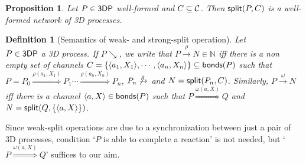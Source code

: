 \documentclass[11pt]{article}
\newcommand{\bonds}{{\sf bonds}}
\newcommand{\Split}{{\sf split}}
\newcommand{\proc}{\sf{3DP}}
\newcommand{\channels}{{\cal C}}
\newcommand{\nar}[1]{\xrightarrow{#1}}
\newcommand{\dnar}[1]{\stackrel{#1}{\Rightarrow}}
\newcommand{\nets}{{\mathbb N}}
\newtheorem{definition}{Definition}
\newtheorem{proposition}{Proposition}
\begin{document}
\begin{proposition}\label{prop:split-closure}
Let $P \in \proc$ well-formed and $C \subseteq \channels$. Then $\Split(P,C)$ is a well-formed
network of 3D processes.
\end{proposition}


\begin{definition}[Semantics of weak- and strong-split operation] \label{def:creaction}
Let\\
\noindent $P \in \proc$ a 3D process. If $P\searrow$, we write that $P \nar{\rho} N \in \nets$ iff
there is a non empty set of channels $C =\{\langle a_1, X_1 \rangle, \cdots, \langle a_n,X_n \rangle
\} \subseteq \bonds(P)$ such that $P=P_0 \dnar{\rho(a_1, X_1)} P_1 \cdots \dnar{\rho(a_n, X_n)}
P_n$, $P_n \not\nar{\rho}$  and $N = \Split(P_n,C)$. Similarly, $P \nar{\omega} N$ iff there is a
channel $\langle a, X \rangle \in \bonds(P)$ such that $P \dnar{\omega(a, X)} Q$ and $N = \Split(Q,
\{\langle a, X \rangle\})$.
\end{definition}

Since weak-split operations are due to a synchronization between just a pair of 3D processes,
condition `$P$ is able to complete a reaction' is not needed, but `$P \dnar{\omega(a, X)} Q$'
suffices to our aim.
\end{document}
